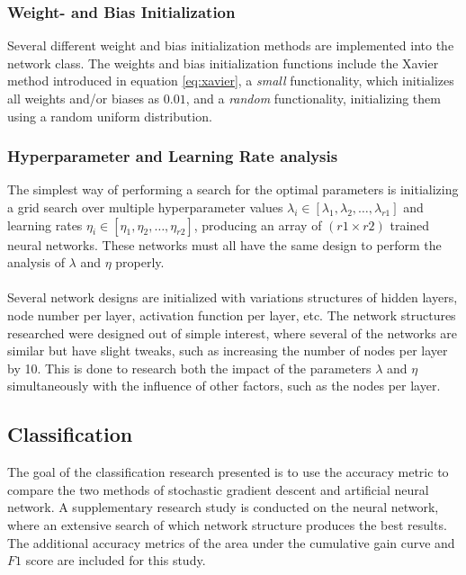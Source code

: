         \subsubsection{Weight- and Bias Initialization}
            Several different weight and bias initialization methods are implemented into the network class. The weights and bias initialization functions include the Xavier method introduced in equation \ref{eq:xavier}, a \textit{small} functionality, which initializes all weights and/or biases as $0.01$, and a \textit{random} functionality, initializing them using a random uniform distribution.
            
        \subsubsection{Hyperparameter and Learning Rate analysis}
            The simplest way of performing a search for the optimal parameters is initializing a grid search over multiple hyperparameter values $\lambda_i \in [\lambda_1, \lambda_2, \hdots, \lambda_{r1}]$ and learning rates $\eta_i \in [\eta_1, \eta_2, \hdots, \eta_{r2}]$, producing an array of $(r1 \times r2)$ trained neural networks. These networks must all have the same design to perform the analysis of $\lambda$ and $\eta$ properly.\\\\
            Several network designs are initialized with variations structures of hidden layers, node number per layer, activation function per layer, etc. The network structures researched were designed out of simple interest, where several of the networks are similar but have slight tweaks, such as increasing the number of nodes per layer by 10. This is done to research both the impact of the parameters $\lambda$ and $\eta$ simultaneously with the influence of other factors, such as the nodes per layer.
          
    \subsection{Classification}
        The goal of the classification research presented is to use the accuracy metric to compare the two methods of stochastic gradient descent and artificial neural network. A supplementary research study is conducted on the neural network, where an extensive search of which network structure produces the best results. The additional accuracy metrics of the area under the cumulative gain curve and $F1$ score are included for this study.
